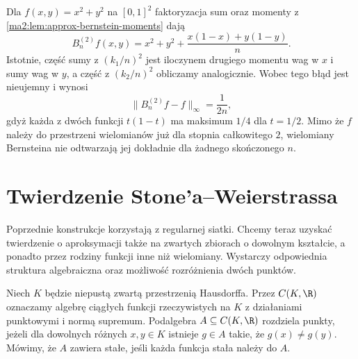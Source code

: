 \begin{przyklad}
\label{ma2:ex:approx-bernstein-surface}
Dla $f(x,y)=x^2+y^2$ na $[0,1]^2$
faktoryzacja sum oraz momenty z
\ref{ma2:lem:approx-bernstein-moments} dają
\[
 B_n^{(2)}f(x,y)
 =x^2+y^2+\frac{x(1-x)+y(1-y)}n.
\]
Istotnie, część sumy z $(k_1/n)^2$
jest iloczynem drugiego momentu wag w $x$
i sumy wag w $y$, a część z $(k_2/n)^2$
obliczamy analogicznie.
Wobec tego błąd jest nieujemny i wynosi
\[
 \|B_n^{(2)}f-f\|_\infty=\frac1{2n},
\]
gdyż każda z dwóch funkcji $t(1-t)$
ma maksimum $1/4$ dla $t=1/2$.
Mimo że $f$ należy do przestrzeni wielomianów
już dla stopnia całkowitego $2$,
wielomiany Bernsteina nie odtwarzają jej
dokładnie dla żadnego skończonego $n$.
\end{przyklad}

\section{Twierdzenie Stone'a--Weierstrassa}

Poprzednie konstrukcje korzystają z regularnej siatki.
Chcemy teraz uzyskać twierdzenie o aproksymacji
także na zwartych zbiorach o dowolnym kształcie,
a ponadto przez rodziny funkcji inne niż wielomiany.
Wystarczy odpowiednia struktura algebraiczna
oraz możliwość rozróżnienia dwóch punktów.

\begin{definicja}
\label{ma2:def:approx-separate}
Niech $K$ będzie niepustą zwartą przestrzenią
Hausdorffa. Przez $C(K,\R)$ oznaczamy algebrę
ciągłych funkcji rzeczywistych na $K$ z działaniami
punktowymi i normą supremum.
Podalgebra $A\subseteq C(K,\R)$ rozdziela punkty,
jeżeli dla dowolnych różnych $x,y\in K$
istnieje $g\in A$ takie, że $g(x)\ne g(y)$.
Mówimy, że $A$ zawiera stałe, jeśli każda funkcja
stała należy do $A$.
\end{definicja}

